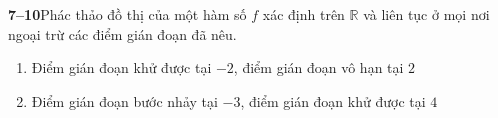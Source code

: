 \begin{minipage}[t]{0.485\textwidth}
\noindent{\color{stewartcyan}\rule{\linewidth}{0.5pt}}
\vspace{4pt}

\noindent
\textbf{\textsf{\color{stewartcyan}7--10}}\enskip Phác thảo đồ thị của một hàm số $f$ xác định trên $\mathbb{R}$ và liên tục ở mọi nơi ngoại trừ các điểm gián đoạn đã nêu.
\vspace{3pt}

\begin{enumerate}[label=\textbf{\arabic*.}, leftmargin=15pt, itemsep=4pt, topsep=0pt, start=7]
\item Điểm gián đoạn khử được tại $-2$, điểm gián đoạn vô hạn tại $2$
\item Điểm gián đoạn bước nhảy tại $-3$, điểm gián đoạn khử được tại $4$
\end{enumerate}
\end{minipage}%
\hfill
